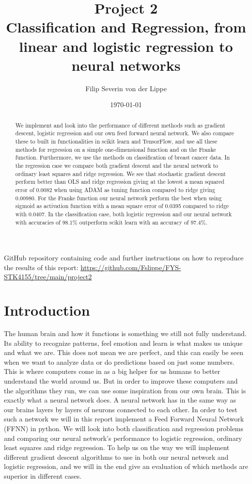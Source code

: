 \documentclass[11pt]{article}
\title{Project 2\\ Classification and Regression, from linear and logistic regression to neural networks}
\author{Filip Severin von der Lippe}
\date{\today}
\begin{document}
\maketitle
GitHub repository containing code and further instructions on how to reproduce the results of this report: \url{https://github.com/Fslippe/FYS-STK4155/tree/main/project2}
\begin{abstract}
    We implement and look into the performance of different methods such as gradient descent, logistic regression and our own feed forward neural network. We also compare these to built in functionalities in scikit learn and TensorFlow, and use all these methods for regression on a simple one-dimensional function and on the Franke function. Furthermore, we use the methods on classification of breast cancer data. In the regression case we compare both gradient descent and the neural network to ordinary least squares and ridge regression. We see that stochastic gradient descent perform better than OLS and ridge regression giving at the lowest a mean squared error of $0.0082$ when using ADAM as tuning function compared to ridge giving 0.00980. For the Franke function our neural network perform the best when using sigmoid as activation function with a mean square error of 0.0395 compared to ridge with 0.0407. In the classification case, both logistic regression and our neural network with accuracies of 98.1\% outperform scikit learn with an accuracy of 97.4\%.
\end{abstract}
\newpage
\tableofcontents
\newpage
\section{Introduction}
The human brain and how it functions is something we still not fully understand. Its ability to recognize patterns, feel emotion and learn is what makes us unique and what we are. This does not mean we are perfect, and this can easily be seen when we want to analyze data or do predictions based on just some numbers. This is where computers come in as a big helper for us humans to better understand the world around us. But in order to improve these computers and the algorithms they run, we can use some inspiration from our own brain. This is exactly what a neural network does. A neural network has in the same way as our brains layers by layers of neurons connected to each other. In order to test such a network we will in this report implement a Feed Forward Neural Network (FFNN) in python. We will look into both classification and regression problems and comparing our neural network's performance to logistic regression, ordinary least squares and ridge regression. To help us on the way we will implement different gradient descent algorithms to use in both our neural network and logistic regression, and we will in the end give an evaluation of which methods are superior in different cases.
\end{document}
